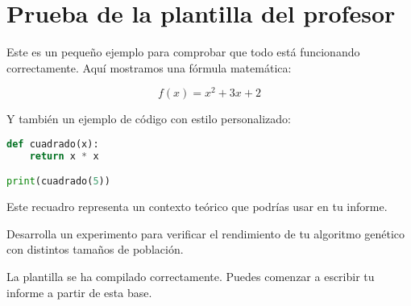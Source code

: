 \documentclass{article}
\begin{document}
\section*{Prueba de la plantilla del profesor}

Este es un pequeño ejemplo para comprobar que todo está funcionando correctamente. Aquí mostramos una fórmula matemática:

\[
f(x) = x^2 + 3x + 2
\]

Y también un ejemplo de código con estilo personalizado:

\begin{lstlisting}[style=matlabstyle, language=Python, caption={Algoritmo simple}]
def cuadrado(x):
    return x * x

print(cuadrado(5))
\end{lstlisting}

\begin{tcolorbox}[contexto]
Este recuadro representa un contexto teórico que podrías usar en tu informe.
\end{tcolorbox}

\begin{tcolorbox}[ejercicio]
Desarrolla un experimento para verificar el rendimiento de tu algoritmo genético con distintos tamaños de población.
\end{tcolorbox}

\begin{tcolorbox}[conclusion]
La plantilla se ha compilado correctamente. Puedes comenzar a escribir tu informe a partir de esta base.
\end{tcolorbox}
\end{document}
